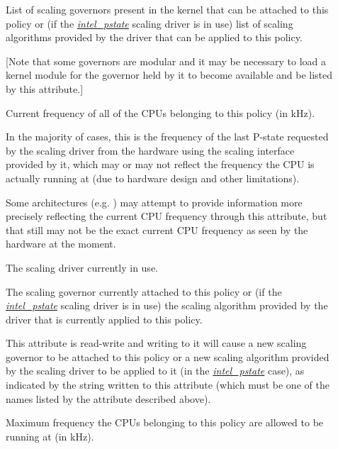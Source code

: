 \documentclass[a4paper,8pt,english]{sphinxmanual}
\begin{document}
\begin{description}
\item[{}] \leavevmode
List of  scaling governors present in the kernel that can
be attached to this policy or (if the {\hyperref[admin\string-guide/pm/intel_pstate::doc]{\emph{\emph{intel\_pstate}}}} scaling driver is
in use) list of scaling algorithms provided by the driver that can be
applied to this policy.

{[}Note that some governors are modular and it may be necessary to load a
kernel module for the governor held by it to become available and be
listed by this attribute.{]}

\item[{}] \leavevmode
Current frequency of all of the CPUs belonging to this policy (in kHz).

In the majority of cases, this is the frequency of the last P-state
requested by the scaling driver from the hardware using the scaling
interface provided by it, which may or may not reflect the frequency
the CPU is actually running at (due to hardware design and other
limitations).

Some architectures (e.g. ) may attempt to provide information
more precisely reflecting the current CPU frequency through this
attribute, but that still may not be the exact current CPU frequency as
seen by the hardware at the moment.

\item[{}] \leavevmode
The scaling driver currently in use.

\item[{}] \leavevmode
The scaling governor currently attached to this policy or (if the
{\hyperref[admin\string-guide/pm/intel_pstate::doc]{\emph{\emph{intel\_pstate}}}} scaling driver is in use) the scaling algorithm
provided by the driver that is currently applied to this policy.

This attribute is read-write and writing to it will cause a new scaling
governor to be attached to this policy or a new scaling algorithm
provided by the scaling driver to be applied to it (in the
{\hyperref[admin\string-guide/pm/intel_pstate::doc]{\emph{\emph{intel\_pstate}}}} case), as indicated by the string written to this
attribute (which must be one of the names listed by the
 attribute described above).

\item[{}] \leavevmode
Maximum frequency the CPUs belonging to this policy are allowed to be
running at (in kHz).


\end{description}
\end{document}
